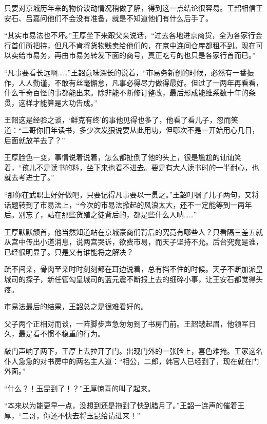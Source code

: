 只要对京城历年来的物价波动情况稍做了解，得到这一点结论很容易。王韶相信王安石、吕嘉问他们不会没有准备，就是不知道他们有什么后手了。

“其实市易法也不坏。”王厚坐下来跟父亲说话，“过去各地进京商货，全为各家行会行首们所把持，但凡不肯将货物贱卖给他们的，在京中连间仓库都租不到。现在可以卖给市易务，再由市易务转发下面的商号，真正吃亏的也只是各家行首而已。”

“凡事要看长远啊……”王韶意味深长的说着，“市易务新创的时候，必然有一番振作，人人勤谨，不敢有丝毫懈怠，凡事必得尽力做得最好。但过了一两年再看看，什么千奇百怪的事都能出来。除非能不断修订整改，最后形成能维系数十年的条贯，这样才能算是大功告成。”

王韶这是经验之谈，‘鲜克有终’的事他见得也多了，他看了看儿子，忽而笑道：“二哥你旧年读书，多少次发狠说要从此用功，但哪次不是一开始用心几日，后面就放羊去了？”

王厚脸色一变，事情说着说着，怎么都扯倒了他的头上，很是尴尬的讪讪笑着，“孩儿不是读书的料，坐下来也看不进去。要是有大人读书时的一半耐心，也就去考进士了。”

“那你在武职上好好做吧，只要记得凡事要以一贯之。”王韶叮嘱了儿子两句，又将话题转到了市易法上，“今次的市易法掀起的风浪太大，还不一定能等到一两年后。别忘了，站在那些货殖之徒背后的，都是些什么人呐……”

王厚默默颔首，他当然知道站在京城豪商们背后的究竟有哪些人？只看隔三差五就从宫中传出小道消息，说两宫哭诉，欲费市易，而天子坚持不允。后台究竟是谁，已经很明显了。只是又有谁能将之解决？

疏不间亲，骨肉至亲时时刻刻都在耳边说着，总有挡不住的时候。天子不断加派皇城司的探子，新任管勾皇城司的蓝元震不断报上去的细碎小事，让王安石都觉得头疼。

市易法最后的结果，王韶总之是很难看好的。

父子两个正相对而谈，一阵脚步声急匆匆到了书房门前。王韶皱起眉，他领军日久，最是看不惯不稳重的行为。

敲门声响了两下，王厚上去拉开了门。出现门外的一张脸上，喜色难掩。王家这名仆人急急的对书房中的两名主人道：“相公，二郎，韩官人已经到了，现在就在门外面。”

“什么？！玉昆到了！？”王厚惊喜的叫了起来。

“本来以为能更早一点，没想到还是拖到了快到腊月了。”王韶一连声的催着王厚，“二哥，你还不快去将玉昆给请进来！”

